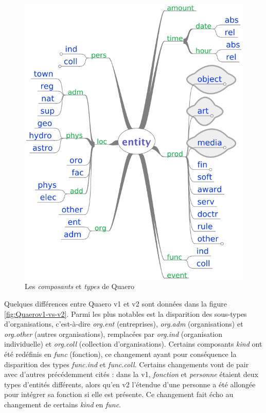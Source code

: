\documentclass[12pt,a4paper,times,twoside,openright]{report}
\begin{document}
\begin{figure}[ht!]
\begin{minipage}{0.49\linewidth}
   \includegraphics[scale=0.45]{images/quaero/annotation_guide-entities}
\end{minipage}
\caption{Les \emph{composants} et \emph{types} de Quaero}
\label{fig:quaero-components-entities}
\end{figure}

Quelques différences entre Quaero v1 et v2 sont données dans la figure \ref{fig:Quaerov1-vs-v2}. Parmi les plus notables est la disparition des sous-types d'organisations, c'est-à-dire \emph{org.ent} (entreprises), \emph{org.adm} (organisations) et \emph{org.other} (autres organisations), remplacées par \emph{org.ind} (organisation individuelle) et \emph{org.coll} (collection d'organisations). Certains composants \emph{kind} ont été redéfinis en \emph{func} (fonction), ce changement ayant pour conséquence la disparition des types \emph{func.ind} et \emph{func.coll}. Certains changements vont de pair avec d'autres précédemment cités : dans la v1, \emph{fonction} et \emph{personne} étaient deux types d'entités différents, alors qu'en v2 l'étendue d'une personne a été allongée pour intégrer sa fonction si elle est présente. Ce changement fait écho au changement de certains \emph{kind} en \emph{func}.
\end{document}
